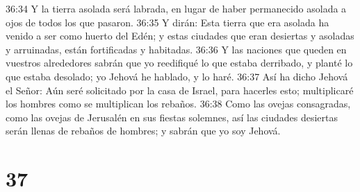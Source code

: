 36:34 Y la tierra asolada será labrada, en lugar de haber permanecido asolada a ojos de todos los que pasaron.  
36:35 Y dirán: Esta tierra que era asolada ha venido a ser como huerto del Edén; y estas ciudades que eran desiertas y asoladas y arruinadas, están fortificadas y habitadas.  
36:36 Y las naciones que queden en vuestros alrededores sabrán que yo reedifiqué lo que estaba derribado, y planté lo que estaba desolado; yo Jehová he hablado, y lo haré.  
36:37 Así ha dicho Jehová el Señor: Aún seré solicitado por la casa de Israel, para hacerles esto; multiplicaré los hombres como se multiplican los rebaños.  
36:38 Como las ovejas consagradas, como las ovejas de Jerusalén en sus fiestas solemnes, así las ciudades desiertas serán llenas de rebaños de hombres; y sabrán que yo soy Jehová.  

\chapter{37}


